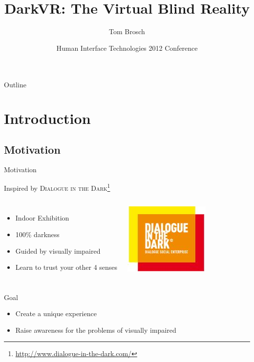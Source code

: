 \documentclass{beamer}
\title{DarkVR: The Virtual Blind Reality}
\author{Tom Brosch}
\institute[Universities of British Columbia]
{
Electrical and Computer Engineering\\
University of British Columbia
}
\date{Human Interface Technologies 2012 Conference}
\begin{document}
\begin{frame}
\titlepage
\end{frame}

\begin{frame}{Outline}
\tableofcontents
\end{frame}


\section{Introduction}

\subsection{Motivation}

\begin{frame}{Motivation}

Inspired by \textsc{Dialogue in the
Dark}\footnote{\url{http://www.dialogue-in-the-dark.com/}}
\begin{columns}
\begin{itemize}
  \item Indoor Exhibition
  \item 100\% darkness
  \item Guided by visually impaired
  \item Learn to trust your other 4 senses 
\end{itemize}
\includegraphics[width=\columnwidth]{images/dialog2}
\end{columns}
\vspace{0.5em}
\begin{block}{Goal}
\begin{itemize}
  \item Create a unique experience
  \item Raise awareness for the problems of visually impaired
\end{itemize}
\end{block}

\end{frame}
\end{document}

